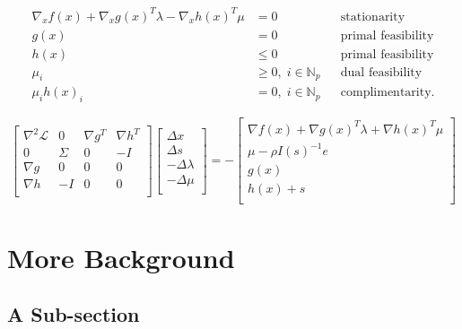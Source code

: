 \documentclass[../thesis.tex]{subfiles}
\begin{document}
    \blindtext[1]
    \begin{subequations}
        \begin{align}
            \nabla_x f(x) + \nabla_x g(x)^T \lambda - \nabla_x h(x)^T \mu &= 0 && \text{stationarity}\\
            g(x) &= 0 && \text{primal feasibility}\\
            h(x) &\leq 0 && \text{primal feasibility}\\
            \mu_i &\geq 0, \; i \in \mathbb{N}_p && \text{dual feasibility}\\
            \mu_i h(x)_i &=0, \; i \in \mathbb{N}_p && \text{complimentarity}.
        \end{align}
        \label{eq:nlp_kkt}
    \end{subequations}

    \blindtext[1]
    \begin{equation}
        \begin{bmatrix}
            \nabla^2 \mathcal{L} & 0 & \nabla g^T & \nabla h^T \\
            0 & \Sigma & 0 & -I \\
            \nabla g & 0 & 0 & 0 \\
            \nabla h & -I & 0 & 0 \\
        \end{bmatrix} 
        \begin{bmatrix}
            \Delta x \\
            \Delta s \\
            -\Delta \lambda \\
            -\Delta \mu\\
        \end{bmatrix} = -
        \begin{bmatrix}
            \nabla f(x) + \nabla g(x)^T \lambda + \nabla h(x)^T \mu \\
            \mu - \rho I(s)^{-1} e \\
            g(x) \\
            h(x) + s \\
        \end{bmatrix}
    \end{equation}


\section{More Background}
    \blindtext[2]

    \subsection{A Sub-section}
    \blindtext[2]
\end{document}
